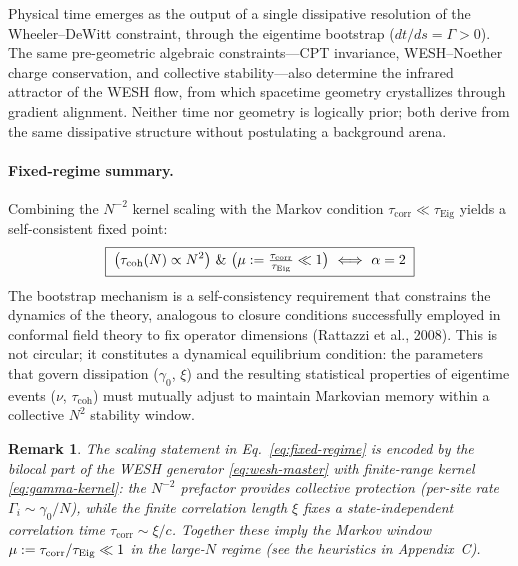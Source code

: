 \documentclass[12pt,a4paper]{article}
\newtheorem{remark}{Remark}[section]
\numberwithin{equation}{section}
\begin{document}
Physical time emerges as the output of a single dissipative resolution of the Wheeler--DeWitt constraint, through the eigentime bootstrap ($dt/ds=\Gamma>0$). The same pre-geometric algebraic constraints---CPT invariance, WESH--Noether charge conservation, and collective stability---also determine the infrared attractor of the WESH flow, from which spacetime geometry crystallizes through gradient alignment. Neither time nor geometry is logically prior; both derive from the same dissipative structure without postulating a background arena.

\paragraph{Fixed-regime summary.}
Combining the $N^{-2}$ kernel scaling with the Markov condition
$\tau_{\mathrm{corr}} \ll \tau_{\mathrm{Eig}}$ yields a self-consistent
fixed point:
\begin{equation}
\boxed{\;
\big(\tau_{\mathrm{coh}}(N)\propto N^2\big)\ \&\
\big(\mu:=\tfrac{\tau_{\mathrm{corr}}}{\tau_{\rm Eig}}\ll 1\big)
\ \Longleftrightarrow\ \alpha=2
\;}
\label{eq:fixed-regime}
\end{equation}
The bootstrap mechanism is a self-consistency requirement 
that constrains the dynamics of the theory, analogous to closure conditions 
successfully employed in conformal field theory to fix operator dimensions 
(Rattazzi et al., 2008). This is not circular; it constitutes a 
dynamical equilibrium condition: the parameters that govern dissipation 
($\gamma_0$, $\xi$) and the resulting statistical properties of eigentime 
events ($\nu$, $\tau_{\mathrm{coh}}$) must mutually adjust to maintain 
Markovian memory within a collective $N^2$ stability window.

\begin{remark}
The scaling statement in Eq.~\eqref{eq:fixed-regime} is encoded by the
bilocal part of the WESH generator \eqref{eq:wesh-master} with finite-range kernel
\eqref{eq:gamma-kernel}: the $N^{-2}$ prefactor provides collective
protection (per-site rate $\Gamma_i\!\sim\!\gamma_0/N$), while the finite
correlation length $\xi$ fixes a state-independent correlation time
$\tau_{\mathrm{corr}}\!\sim\!\xi/c$. Together these imply the Markov window
$\mu:=\tau_{\mathrm{corr}}/\tau_{\rm Eig}\ll 1$ in the large-$N$ regime
(see the heuristics in Appendix~C).
\end{remark}

\vspace{0.8cm}
\end{document}
